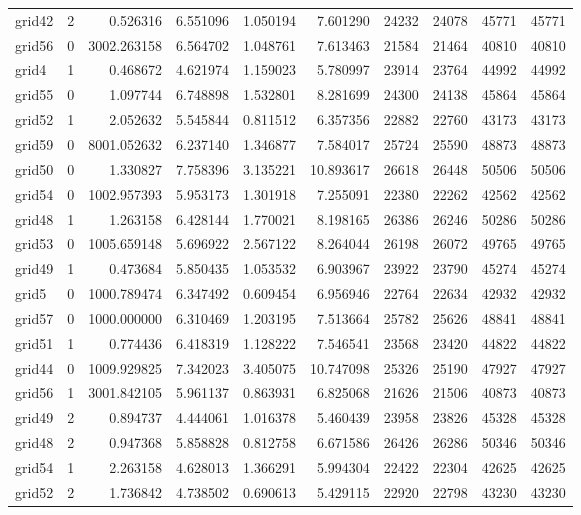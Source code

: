 \begin{longtable}{|l|r|r|r|r|r|r|r|r|r|}
grid42 & 2 & 0.526316 & 6.551096 & 1.050194 & 7.601290 & 24232 & 24078 & 45771 & 45771 \\
grid56 & 0 & 3002.263158 & 6.564702 & 1.048761 & 7.613463 & 21584 & 21464 & 40810 & 40810 \\
grid4 & 1 & 0.468672 & 4.621974 & 1.159023 & 5.780997 & 23914 & 23764 & 44992 & 44992 \\
grid55 & 0 & 1.097744 & 6.748898 & 1.532801 & 8.281699 & 24300 & 24138 & 45864 & 45864 \\
grid52 & 1 & 2.052632 & 5.545844 & 0.811512 & 6.357356 & 22882 & 22760 & 43173 & 43173 \\
grid59 & 0 & 8001.052632 & 6.237140 & 1.346877 & 7.584017 & 25724 & 25590 & 48873 & 48873 \\
grid50 & 0 & 1.330827 & 7.758396 & 3.135221 & 10.893617 & 26618 & 26448 & 50506 & 50506 \\
grid54 & 0 & 1002.957393 & 5.953173 & 1.301918 & 7.255091 & 22380 & 22262 & 42562 & 42562 \\
grid48 & 1 & 1.263158 & 6.428144 & 1.770021 & 8.198165 & 26386 & 26246 & 50286 & 50286 \\
grid53 & 0 & 1005.659148 & 5.696922 & 2.567122 & 8.264044 & 26198 & 26072 & 49765 & 49765 \\
grid49 & 1 & 0.473684 & 5.850435 & 1.053532 & 6.903967 & 23922 & 23790 & 45274 & 45274 \\
grid5 & 0 & 1000.789474 & 6.347492 & 0.609454 & 6.956946 & 22764 & 22634 & 42932 & 42932 \\
grid57 & 0 & 1000.000000 & 6.310469 & 1.203195 & 7.513664 & 25782 & 25626 & 48841 & 48841 \\
grid51 & 1 & 0.774436 & 6.418319 & 1.128222 & 7.546541 & 23568 & 23420 & 44822 & 44822 \\
grid44 & 0 & 1009.929825 & 7.342023 & 3.405075 & 10.747098 & 25326 & 25190 & 47927 & 47927 \\
grid56 & 1 & 3001.842105 & 5.961137 & 0.863931 & 6.825068 & 21626 & 21506 & 40873 & 40873 \\
grid49 & 2 & 0.894737 & 4.444061 & 1.016378 & 5.460439 & 23958 & 23826 & 45328 & 45328 \\
grid48 & 2 & 0.947368 & 5.858828 & 0.812758 & 6.671586 & 26426 & 26286 & 50346 & 50346 \\
grid54 & 1 & 2.263158 & 4.628013 & 1.366291 & 5.994304 & 22422 & 22304 & 42625 & 42625 \\
grid52 & 2 & 1.736842 & 4.738502 & 0.690613 & 5.429115 & 22920 & 22798 & 43230 & 43230 \\

\end{longtable}
